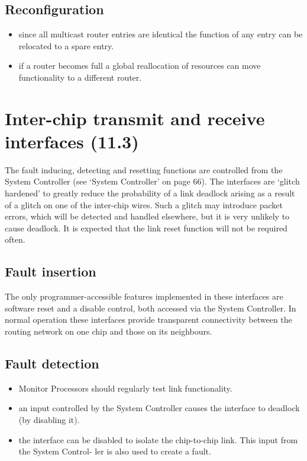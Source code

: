 \documentclass[oneside, a4paper, 11pt]{memoir}
\newenvironment{itmz}{
	\begin{itemize}
		\setlength{\itemsep}{0pt}
		\setlength{\parskip}{0pt}
	}{\end{itemize}}
\begin{document}
\subsection*{Reconfiguration}
\begin{itmz}
\item since all multicast router entries are identical the function of any entry can be relocated to a spare
entry.
\item if a router becomes full a global reallocation of resources can move functionality to a different
router.
\end{itmz}

\section{Inter-chip transmit and receive interfaces (11.3)}
The fault inducing, detecting and resetting functions are controlled from the System Controller (see `System Controller' on page 66). The interfaces are `glitch hardened' to greatly reduce the probability of a link deadlock arising as a result of a glitch on one of the inter-chip wires. Such a glitch may introduce packet errors, which will be detected and handled elsewhere, but it is very unlikely to cause deadlock. It is expected that the link reset function will not be required often.

\subsection*{Fault insertion}
The only programmer-accessible features implemented in these interfaces are software reset and a disable control, both accessed via the System Controller. In normal operation these interfaces provide transparent connectivity between the routing network on one chip and those on its neighbours.

\subsection*{Fault detection}
\begin{itmz}
\item Monitor Processors should regularly test link functionality.
\item an input controlled by the System Controller causes the interface to deadlock (by disabling it).
\item the interface can be disabled to isolate the chip-to-chip link. This input from the System Control-
ler is also used to create a fault.
\end{itmz}
\end{document}
